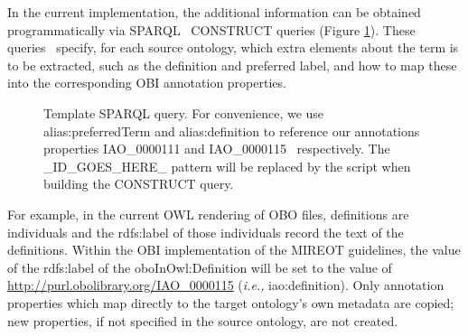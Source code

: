 \documentclass[jou]{ao2e}%
\begin{document}
In the current implementation, the additional information can be obtained programmatically via SPARQL~\citep{SPARQL} CONSTRUCT queries (Figure \ref{fig:sparql}).
These queries~\citep{OBIQueries} specify, for each source ontology, which extra elements about the term is to be extracted, such as the definition and preferred label, and how to map these into the corresponding OBI annotation properties. 

\begin{figure}[t]
\scriptsize
 
\caption{Template SPARQL query. For convenience, we use alias:preferredTerm and
alias:definition to reference our annotations properties IAO\_0000111 and IAO\_0000115~\citep{IAO} respectively. The \_ID\_GOES\_HERE\_ pattern will be replaced by the script when building the CONSTRUCT query.}
\label{fig:sparql}
\end{figure}

For example, in the current \ac{OWL} rendering of \ac{OBO} files, definitions are individuals and the rdfs:label of those individuals record the text of the definitions. 
Within the \ac{OBI} implementation of the \ac{MIREOT} guidelines, the value of the rdfs:label of the oboInOwl:Definition will be set to the value of \url{http://purl.obolibrary.org/IAO_0000115} (\emph{i.e.,} iao:definition). Only annotation properties which map directly to the target ontology's own metadata are copied; new properties, if not specified in the source ontology, are not created. 
\end{document}

